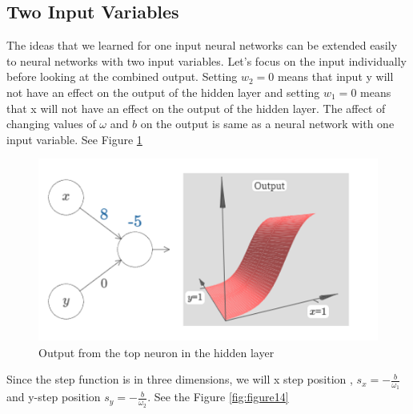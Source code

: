\documentclass{article}
\begin{document}
\subsection{Two Input Variables}
The ideas that we learned for one input neural networks can be extended easily to neural networks with two input variables. 
Let's focus on the input individually before looking at the combined output. Setting $w_2 = 0$ means that input y will not have an effect on the output of the hidden layer and setting $w_1=0$ means that x will not have an effect on the output of the hidden layer. The affect of changing values of $\omega$ and $b$ on the output is same as a neural network with one input variable. See Figure \ref{fig:figure13}
\begin{figure}[H]
    \centering
    \includegraphics[width=0.5 \textwidth]{Images/2/11.png}
    \caption{Output from the top neuron in the hidden layer}
    \label{fig:figure13}
\end{figure}
Since the step function is in three dimensions, we will x step position , $s_x = -\frac{b}{\omega_1}$ and y-step position $s_y = -\frac{b}{\omega_2}$. See the Figure \ref{fig:figure14}
\end{document}
